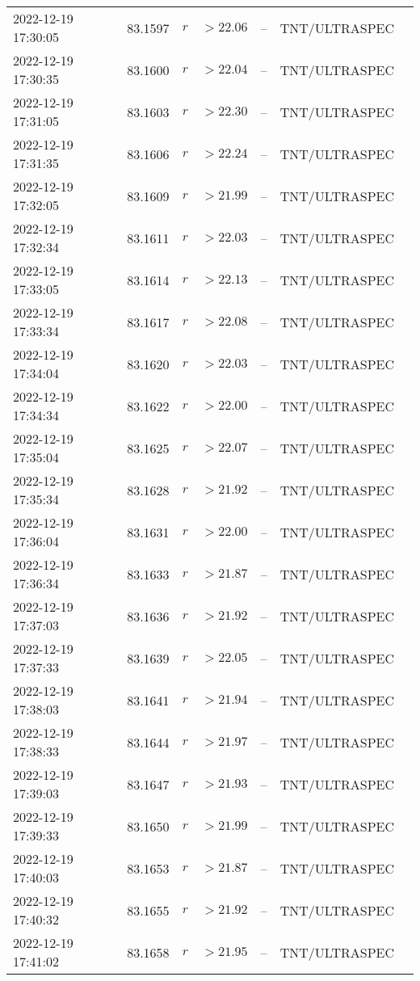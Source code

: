 \documentclass{nature_plusfigure}
\begin{document}
\begin{supplement}
\begin{center}
\begin{longtable}{lllllll}
2022-12-19 17:30:05 & 83.1597 & $r$ & $>22.06$ & -- & TNT/ULTRASPEC &  \\ 
2022-12-19 17:30:35 & 83.1600 & $r$ & $>22.04$ & -- & TNT/ULTRASPEC &  \\ 
2022-12-19 17:31:05 & 83.1603 & $r$ & $>22.30$ & -- & TNT/ULTRASPEC &  \\ 
2022-12-19 17:31:35 & 83.1606 & $r$ & $>22.24$ & -- & TNT/ULTRASPEC &  \\ 
2022-12-19 17:32:05 & 83.1609 & $r$ & $>21.99$ & -- & TNT/ULTRASPEC &  \\ 
2022-12-19 17:32:34 & 83.1611 & $r$ & $>22.03$ & -- & TNT/ULTRASPEC &  \\ 
2022-12-19 17:33:05 & 83.1614 & $r$ & $>22.13$ & -- & TNT/ULTRASPEC &  \\ 
2022-12-19 17:33:34 & 83.1617 & $r$ & $>22.08$ & -- & TNT/ULTRASPEC &  \\ 
2022-12-19 17:34:04 & 83.1620 & $r$ & $>22.03$ & -- & TNT/ULTRASPEC &  \\ 
2022-12-19 17:34:34 & 83.1622 & $r$ & $>22.00$ & -- & TNT/ULTRASPEC &  \\ 
2022-12-19 17:35:04 & 83.1625 & $r$ & $>22.07$ & -- & TNT/ULTRASPEC &  \\ 
2022-12-19 17:35:34 & 83.1628 & $r$ & $>21.92$ & -- & TNT/ULTRASPEC &  \\ 
2022-12-19 17:36:04 & 83.1631 & $r$ & $>22.00$ & -- & TNT/ULTRASPEC &  \\ 
2022-12-19 17:36:34 & 83.1633 & $r$ & $>21.87$ & -- & TNT/ULTRASPEC &  \\ 
2022-12-19 17:37:03 & 83.1636 & $r$ & $>21.92$ & -- & TNT/ULTRASPEC &  \\ 
2022-12-19 17:37:33 & 83.1639 & $r$ & $>22.05$ & -- & TNT/ULTRASPEC &  \\ 
2022-12-19 17:38:03 & 83.1641 & $r$ & $>21.94$ & -- & TNT/ULTRASPEC &  \\ 
2022-12-19 17:38:33 & 83.1644 & $r$ & $>21.97$ & -- & TNT/ULTRASPEC &  \\ 
2022-12-19 17:39:03 & 83.1647 & $r$ & $>21.93$ & -- & TNT/ULTRASPEC &  \\ 
2022-12-19 17:39:33 & 83.1650 & $r$ & $>21.99$ & -- & TNT/ULTRASPEC &  \\ 
2022-12-19 17:40:03 & 83.1653 & $r$ & $>21.87$ & -- & TNT/ULTRASPEC &  \\ 
2022-12-19 17:40:32 & 83.1655 & $r$ & $>21.92$ & -- & TNT/ULTRASPEC &  \\ 
2022-12-19 17:41:02 & 83.1658 & $r$ & $>21.95$ & -- & TNT/ULTRASPEC &  \\ 

\end{longtable}
\end{center}
\end{supplement}
\end{document}
